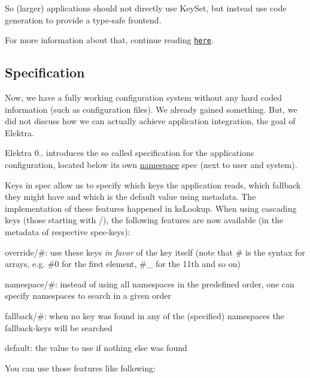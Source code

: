 So (larger) applications should not directly use {\ttfamily Key\+Set}, but instead use code generation to provide a type-\/safe frontend.

For more information about that, continue reading \href{https://github.com/ElektraInitiative/libelektra/tree/master/src/tools/gen}{\tt here}.

\subsection*{Specification}

Now, we have a fully working configuration system without any hard coded information (such as configuration files). We already gained something. But, we did not discuss how we can actually achieve application integration, the goal of Elektra.

Elektra 0.. introduces the so called specification for the application\textquotesingle{}s configuration, located below its own \hyperlink{doc_help_elektra-namespaces_md}{namespace} {\ttfamily spec} (next to user and system).

Keys in {\ttfamily spec} allow us to specify which keys the application reads, which fallback they might have and which is the default value using metadata. The implementation of these features happened in {\ttfamily ks\+Lookup}. When using cascading keys (those starting with {\ttfamily /}), the following features are now available (in the metadata of respective {\ttfamily spec}-\/keys)\+:


\begin{DoxyItemize}
\item {\ttfamily override/\#}\+: use these keys {\itshape in favor} of the key itself (note that {\ttfamily \#} is the syntax for arrays, e.\+g. {\ttfamily \#0} for the first element, {\ttfamily \#\+\_} for the 11th and so on)
\item {\ttfamily namespace/\#}\+: instead of using all namespaces in the predefined order, one can specify namespaces to search in a given order
\item {\ttfamily fallback/\#}\+: when no key was found in any of the (specified) namespaces the {\ttfamily fallback}-\/keys will be searched
\item {\ttfamily default}\+: the value to use if nothing else was found
\end{DoxyItemize}

You can use those features like following\+:




